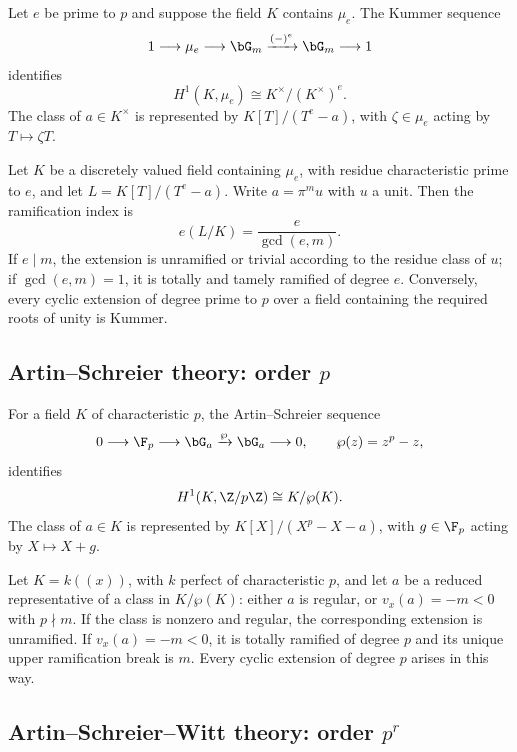 Let $e$ be prime to $p$ and suppose the field $K$ contains $\mu_e$. The Kummer
sequence
\[
    1\longrightarrow\mu_e\longrightarrow\bG_m
      \xrightarrow{(-)^e}\bG_m\longrightarrow1
\]
identifies
\[
    H^1(K,\mu_e)\cong K^\times/(K^\times)^e.
\]
The class of $a\in K^\times$ is represented by
$K[T]/(T^e-a)$, with $\zeta\in\mu_e$ acting by $T\mapsto\zeta T$.

\begin{theorem}
\label{theorem:kummer_ramification}
Let $K$ be a discretely valued field containing $\mu_e$, with residue
characteristic prime to $e$, and let $L=K[T]/(T^e-a)$. Write $a=\pi^m u$ with
$u$ a unit. Then the ramification index is
\[
    e(L/K)=\frac{e}{\gcd(e,m)}.
\]
If $e\mid m$, the extension is unramified or trivial according to the residue
class of $u$; if $\gcd(e,m)=1$, it is totally and tamely ramified of degree
$e$. Conversely, every cyclic extension of degree prime to $p$ over a field
containing the required roots of unity is Kummer.
\end{theorem}

\subsection{\texorpdfstring{Artin--Schreier theory: order $p$}{Artin--Schreier theory: order p}}

For a field $K$ of characteristic $p$, the Artin--Schreier sequence
\[
  0\longrightarrow\F_p\longrightarrow\bG_a
    \xrightarrow{\wp}\bG_a\longrightarrow0,
  \qquad \wp(z)=z^p-z,
\]
identifies
\[
    H^1(K,\Z/p\Z)\cong K/\wp(K).
\]
The class of $a\in K$ is represented by $K[X]/(X^p-X-a)$, with
$g\in\F_p$ acting by $X\mapsto X+g$.

\begin{theorem}\label{theorem:artin_schreier_ramification}
Let $K=k((x))$, with $k$ perfect of characteristic $p$, and let $a$ be a
reduced representative of a class in $K/\wp(K)$: either $a$ is regular, or
$v_x(a)=-m<0$ with $p\nmid m$. If the class is nonzero and regular, the
corresponding extension is unramified. If $v_x(a)=-m<0$, it is totally
ramified of degree $p$ and its unique upper ramification break is $m$.
Every cyclic extension of degree $p$ arises in this way.
\end{theorem}

\subsection{\texorpdfstring{Artin--Schreier--Witt theory: order $p^r$}{Artin--Schreier--Witt theory: order p-power}}
\label{subsection:witt_vector_prerequisites}

